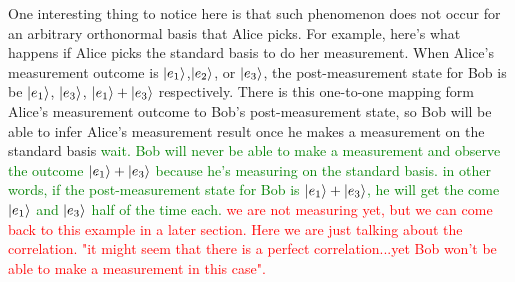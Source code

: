 \begin{example}
One interesting thing to notice here is that such phenomenon does not occur for an arbitrary orthonormal basis that Alice picks. For example, here's what happens if Alice picks the standard basis to do her measurement. When Alice's measurement outcome is $\ket{e_1}$,$\ket{e_2}$, or $\ket{e_3}$, the post-measurement state for Bob is be $\ket{e_1}$, $\ket{e_3}$, $\ket{e_1}+\ket{e_3}$ respectively. There is this one-to-one mapping form Alice's measurement outcome to Bob's post-measurement state, so Bob will be able to infer Alice's measurement result once he makes a measurement on the standard basis 
\textcolor{green}{wait. Bob will never be able to make a measurement and observe the outcome $\ket{e_1}+\ket{e_3}$ because he's measuring on the standard basis. in other words, if the post-measurement state for Bob is $\ket{e_1}+\ket{e_3}$, he will get the come $\ket{e_1}$ and $\ket{e_3}$ half of the time each. } \textcolor{red}{we are not measuring yet, but we can come back to this example in a later section. Here we are just talking about the correlation. "it might seem that there is a perfect correlation...yet Bob won't be able to make a measurement in this case".}



\end{example}
